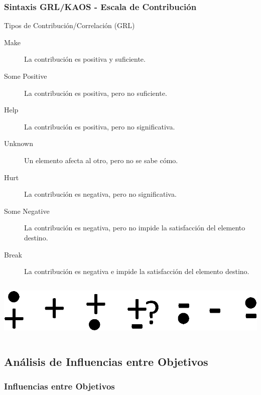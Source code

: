 \documentclass[handout,slidestop,xcolor=pst,dvips,blue]{beamer}
\begin{document}
\begin{frame}[c]
    \frametitle{Sintaxis GRL/KAOS - Escala de Contribución}
    \begin{block}{Tipos de Contribución/Correlación (GRL)}
        \begin{description}
            \item[Make] La contribución es positiva y suficiente.
            \item[Some Positive] La contribución es positiva, pero no suficiente.
            \item[Help] La contribución es positiva, pero no significativa.
            \item[Unknown] Un elemento afecta al otro, pero no se sabe cómo.
            \item[Hurt] La contribución es negativa, pero no significativa.
            \item[Some Negative] La contribución es negativa, pero no impide la satisfacción del elemento destino.
            \item[Break] La contribución es negativa e impide la satisfacción del elemento destino.
        \end{description}
        \begin{columns}[c]
            \begin{column}{\linewidth}
                \centering \includegraphics[width=0.70\columnwidth,keepaspectratio=true]{images/objetivos/influence(GRL).eps}
            \end{column}
        \end{columns}
    \end{block}
\end{frame}

\subsection{Análisis de Influencias entre Objetivos}

\begin{frame}[t]
	\frametitle{Influencias entre Objetivos}
\end{frame}
\end{document}
